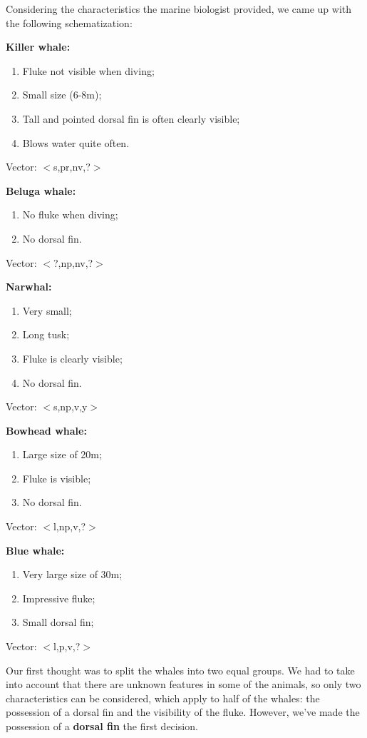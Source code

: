 \documentclass[a4paper]{article}
\begin{document}
Considering the characteristics the marine biologist provided, we came up with the following schematization:

\textbf{Killer whale:}
\begin{enumerate}
    \item Fluke not visible when diving;
    \item Small size (6-8m);
    \item Tall and pointed dorsal fin is often clearly visible;
    \item Blows water quite often.
\end{enumerate}
Vector: $<$s,pr,nv,?$>$  

\textbf{Beluga whale:}
\begin{enumerate}
    \item No fluke when diving;
    \item No dorsal fin.
\end{enumerate}
Vector: $<$?,np,nv,?$>$

\textbf{Narwhal:}
\begin{enumerate}
    \item Very small;
    \item Long tusk;
    \item Fluke is clearly visible;
    \item No dorsal fin.
\end{enumerate}
Vector: $<$s,np,v,y$>$

\textbf{Bowhead whale:}
\begin{enumerate}
    \item Large size of 20m;
    \item Fluke is visible;
    \item No dorsal fin.
\end{enumerate}
Vector: $<$l,np,v,?$>$

\textbf{Blue whale:}
\begin{enumerate}
    \item Very large size of 30m;
    \item Impressive fluke;
    \item Small dorsal fin;
\end{enumerate}
Vector: $<$l,p,v,?$>$


Our first thought was to split the whales into two equal groups. We had to take into account that there are unknown features in some of the animals, so only two characteristics can be considered, which apply to half of the whales: the possession of a dorsal fin and the visibility of the fluke. However, we've made the possession of a \textbf{dorsal fin} the first decision.
\end{document}
